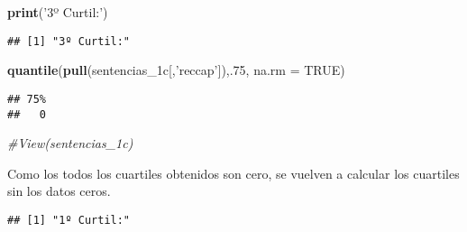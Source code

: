 \documentclass[runningheads,a4paper]{llncs}
\newenvironment{Shaded}{\footnotesize}{}
\newcommand{\KeywordTok}[1]{\textcolor[rgb]{0.00,0.44,0.13}{\textbf{{#1}}}}
\newcommand{\DataTypeTok}[1]{\textcolor[rgb]{0.56,0.13,0.00}{{#1}}}
\newcommand{\DecValTok}[1]{\textcolor[rgb]{0.25,0.63,0.44}{{#1}}}
\newcommand{\StringTok}[1]{\textcolor[rgb]{0.25,0.44,0.63}{{#1}}}
\newcommand{\CommentTok}[1]{\textcolor[rgb]{0.38,0.63,0.69}{\textit{{#1}}}}
\newcommand{\OtherTok}[1]{\textcolor[rgb]{0.00,0.44,0.13}{{#1}}}
\newcommand{\NormalTok}[1]{{#1}}
\newcommand{\OperatorTok}[1]{\textcolor[rgb]{0.40,0.40,0.40}{{#1}}}
\begin{document}
\begin{Shaded}
\begin{Highlighting}[]
\KeywordTok{print}\NormalTok{(}\StringTok{'3º Curtil:'}\NormalTok{)}
\end{Highlighting}
\end{Shaded}

\begin{verbatim}
## [1] "3º Curtil:"
\end{verbatim}

\begin{Shaded}
\begin{Highlighting}[]
\KeywordTok{quantile}\NormalTok{(}\KeywordTok{pull}\NormalTok{(sentencias_1c[,}\StringTok{'reccap'}\NormalTok{]),.}\DecValTok{75}\NormalTok{, }\DataTypeTok{na.rm =} \OtherTok{TRUE}\NormalTok{)}
\end{Highlighting}
\end{Shaded}

\begin{verbatim}
## 75% 
##   0
\end{verbatim}

\begin{Shaded}
\begin{Highlighting}[]
\CommentTok{#View(sentencias_1c)}
\end{Highlighting}
\end{Shaded}

Como los todos los cuartiles obtenidos son cero, se vuelven a calcular
los cuartiles sin los datos ceros.

\begin{Shaded}
\end{Shaded}

\begin{verbatim}
## [1] "1º Curtil:"
\end{verbatim}

\begin{Shaded}
\end{Shaded}
\end{document}
